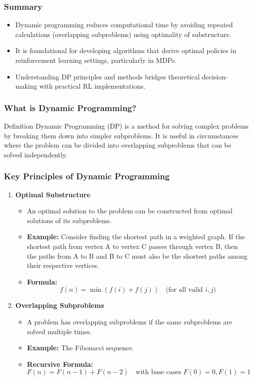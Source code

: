\documentclass{beamer}
\begin{document}
\begin{frame}[fragile]
    \frametitle{Summary}
    \begin{itemize}
        \item Dynamic programming reduces computational time by avoiding repeated calculations (overlapping subproblems) using optimality of substructure.
        \item It is foundational for developing algorithms that derive optimal policies in reinforcement learning settings, particularly in MDPs.
        \item Understanding DP principles and methods bridges theoretical decision-making with practical RL implementations.
    \end{itemize}
\end{frame}

\begin{frame}[fragile]
    \frametitle{What is Dynamic Programming?}
    \begin{block}{Definition}
        Dynamic Programming (DP) is a method for solving complex problems by breaking them down into simpler subproblems. 
        It is useful in circumstances where the problem can be divided into overlapping subproblems that can be solved independently.
    \end{block}
\end{frame}

\begin{frame}[fragile]
    \frametitle{Key Principles of Dynamic Programming}
    \begin{enumerate}
        \item \textbf{Optimal Substructure}
        \begin{itemize}
            \item An optimal solution to the problem can be constructed from optimal solutions of its subproblems.
            \item \textbf{Example:} 
            Consider finding the shortest path in a weighted graph.
            If the shortest path from vertex A to vertex C passes through vertex B, then the paths from A to B and B to C must also be the shortest paths among their respective vertices.
            \item \textbf{Formula:} 
            \[
            f(n) = \min(f(i) + f(j)) \quad \text{(for all valid } i, j \text{)}
            \]
        \end{itemize}
        
        \item \textbf{Overlapping Subproblems}
        \begin{itemize}
            \item A problem has overlapping subproblems if the same subproblems are solved multiple times.
            \item \textbf{Example:} The Fibonacci sequence.
            \item \textbf{Recursive Formula:}
            \[
            F(n) = F(n-1) + F(n-2) \quad \text{with base cases } F(0) = 0, F(1) = 1
            \]
        \end{itemize}
    \end{enumerate}
\end{frame}
\end{document}

